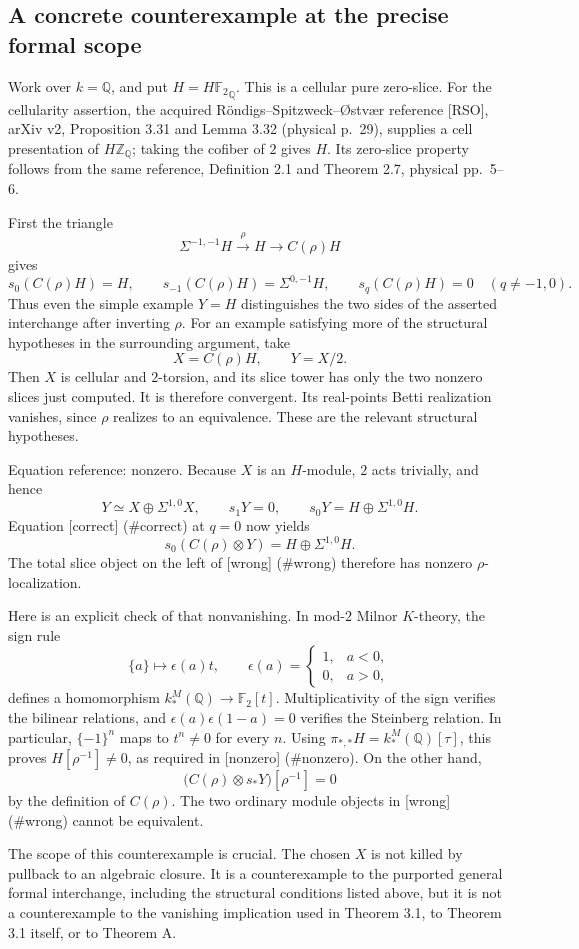\documentclass[10pt]{article}
\begin{document}
\subsection*{A concrete counterexample at the precise formal scope}
Work over \(k=\mathbb Q\), and put \(H={H\mathbb F_2}_{\mathbb Q}\). This is a cellular pure zero-slice. For the cellularity assertion, the acquired Röndigs–Spitzweck–Østvær reference [RSO], arXiv v2, Proposition 3.31 and Lemma 3.32 (physical p. 29), supplies a cell presentation of \(H\mathbb Z_{\mathbb Q}\); taking the cofiber of \(2\) gives \(H\). Its zero-slice property follows from the same reference, Definition 2.1 and Theorem 2.7, physical pp. 5–6.\par
First the triangle \[\Sigma^{-1,-1}H\xrightarrow{\rho}H\longrightarrow C(\rho)H\] gives \[s_0(C(\rho)H)=H,\qquad
 s_{-1}(C(\rho)H)=\Sigma^{0,-1}H,\qquad
 s_q(C(\rho)H)=0\quad(q\ne-1,0).\] Thus even the simple example \(Y=H\) distinguishes the two sides of the asserted interchange after inverting \(\rho\). For an example satisfying more of the structural hypotheses in the surrounding argument, take \[X=C(\rho)H,\qquad Y=X/2.\] Then \(X\) is cellular and \(2\)-torsion, and its slice tower has only the two nonzero slices just computed. It is therefore convergent. Its real-points Betti realization vanishes, since \(\rho\) realizes to an equivalence. These are the relevant structural hypotheses.\par
Equation reference: nonzero. Because \(X\) is an \(H\)-module, \(2\) acts trivially, and hence \[Y\simeq X\oplus\Sigma^{1,0}X,\qquad
 s_1Y=0,\qquad s_0Y=H\oplus\Sigma^{1,0}H.\] Equation [correct] (\#correct) at \(q=0\) now yields \[
 s_0(C(\rho)\otimes Y)=H\oplus\Sigma^{1,0}H.\] The total slice object on the left of [wrong] (\#wrong) therefore has nonzero \(\rho\)-localization.\par
Here is an explicit check of that nonvanishing. In mod-\(2\) Milnor \(K\)-theory, the sign rule \[\{a\}\longmapsto \epsilon(a)t,\qquad
 \epsilon(a)=
 \begin{cases}1,&a<0,\\0,&a>0,\end{cases}\] defines a homomorphism \(k_*^M(\mathbb Q)\to\mathbb F_2[t]\). Multiplicativity of the sign verifies the bilinear relations, and \(\epsilon(a)\epsilon(1-a)=0\) verifies the Steinberg relation. In particular, \(\{-1\}^n\) maps to \(t^n\ne0\) for every \(n\). Using \(\pi_{*,*}H=k_*^M(\mathbb Q)[\tau]\), this proves \(H[\rho^{-1}]\ne0\), as required in [nonzero] (\#nonzero). On the other hand, \[\bigl(C(\rho)\otimes s_*Y\bigr)[\rho^{-1}]=0\] by the definition of \(C(\rho)\). The two ordinary module objects in [wrong] (\#wrong) cannot be equivalent.\par
The scope of this counterexample is crucial. The chosen \(X\) is not killed by pullback to an algebraic closure. It is a counterexample to the purported general formal interchange, including the structural conditions listed above, but it is not a counterexample to the vanishing implication used in Theorem 3.1, to Theorem 3.1 itself, or to Theorem A.\par
\end{document}
